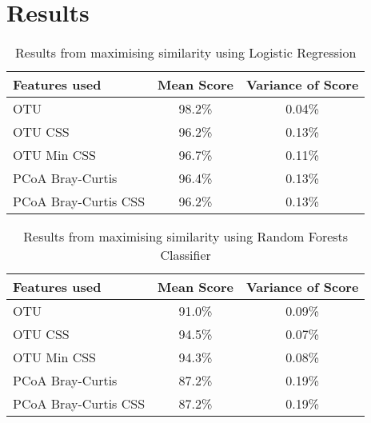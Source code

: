 \chapter{Results}

\ifpdf
    \graphicspath{{Chapter3/Figs/Raster/}{Chapter3/Figs/PDF/}{Chapter3/Figs/}}
\else
    \graphicspath{{Chapter3/Figs/Vector/}{Chapter3/Figs/}}
\fi
\begin{table}
\caption{Results from maximising similarity using Logistic Regression}
\centering
\label{table:similarity}
\begin{tabular}{l c  c}
\hline 
Features used & Mean Score & Variance of Score \\ 
 
\hline
OTU & 98.2\% & 0.04\%   \\
OTU CSS & 96.2\% & 0.13\%   \\
OTU Min CSS & 96.7\% & 0.11\%   \\
PCoA Bray-Curtis &96.4\% & 0.13\%   \\
PCoA Bray-Curtis CSS &96.2\% & 0.13\%   \\

\hline 
\end{tabular}
\end{table}
\begin{table}
	\caption{Results from maximising similarity using Random Forests Classifier}
	\centering
	\label{table:similarity}
	\begin{tabular}{l c  c}
		\hline 
		Features used & Mean Score & Variance of Score \\ 
		
		\hline
		OTU & 91.0\% & 0.09\%   \\
		OTU CSS & 94.5\% & 0.07\%   \\
		OTU Min CSS & 94.3\% & 0.08\%   \\
		PCoA Bray-Curtis &87.2\% & 0.19\%   \\
		PCoA Bray-Curtis CSS &87.2\% & 0.19\%   \\
		
		\hline 
	\end{tabular}
\end{table}


